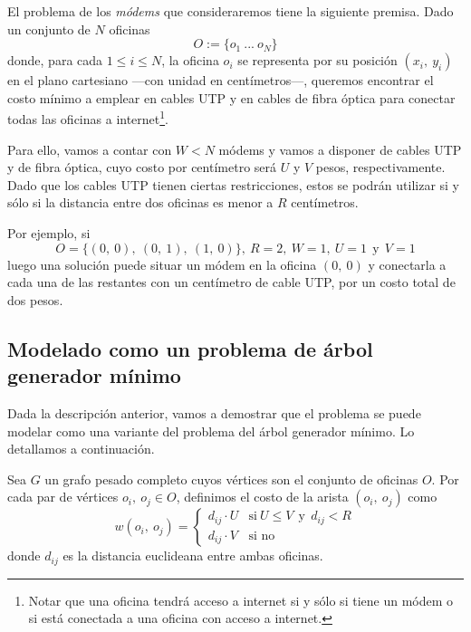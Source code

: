 El problema de los \textit{módems} que consideraremos tiene la siguiente premisa. Dado un conjunto de $N$ oficinas 
\begin{equation*}
    O := \{o_1\ ...\ o_N\}    
\end{equation*}
donde, para cada $1 \leq i \leq N$, la oficina $o_i$ se representa por su posición $(x_i,\ y_i)$ en el plano cartesiano ---con unidad en centímetros---, queremos encontrar el costo mínimo a emplear en cables UTP y en cables de fibra óptica para conectar todas las oficinas a internet\footnote{Notar que una oficina tendrá acceso a internet si y sólo si tiene un módem o si está conectada a una oficina con acceso a internet.}.

Para ello, vamos a contar con $W < N$ módems y vamos a disponer de cables UTP y de fibra óptica, cuyo costo por centímetro será $U$ y $V$ pesos, respectivamente. Dado que los cables UTP tienen ciertas restricciones, estos se podrán utilizar si y sólo si la distancia entre dos oficinas es menor a $R$ centímetros. 

Por ejemplo, si
\begin{equation*}
    O = \{(0,\ 0),\ (0,\ 1),\ (1,\ 0)\},\ R = 2,\ W = 1,\ U = 1\ \: \text{y}\ \: V = 1  
\end{equation*} 
luego una solución puede situar un módem en la oficina $(0,\ 0)$ y conectarla a cada una de las restantes con un centímetro de cable UTP, por un costo total de dos pesos.

\subsection{Modelado como un problema de árbol generador mínimo}

Dada la descripción anterior, vamos a demostrar que el problema se puede modelar como una variante del problema del árbol generador mínimo. Lo detallamos a continuación.

Sea $G$ un grafo pesado completo cuyos vértices son el conjunto de oficinas $O$. Por cada par de vértices $o_i,\ o_j \in O$, definimos el costo de la arista $(o_i,\ o_j)$ como
\begin{equation*}
    w(o_i,\ o_j) = \begin{cases}
        d_{ij} \cdot U &\text{si}\ U \leq V\ \: \text{y}\ \: d_{ij} < R \\
        d_{ij} \cdot V & \text{si no}
    \end{cases}
\end{equation*}
donde $d_{ij}$ es la distancia euclideana entre ambas oficinas. 

